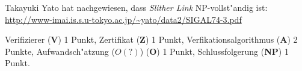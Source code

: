 \begin{diskussion}
Takayuki Yato hat nachgewiesen, dass {\em Slither Link}
NP-vollst"andig ist:
\url{http://www-imai.is.s.u-tokyo.ac.jp/~yato/data2/SIGAL74-3.pdf}
\end{diskussion}

\begin{bewertung}
Verifizierer (\textbf{V}) 1 Punkt,
Zertifikat (\textbf{Z}) 1 Punkt,
Verfikationsalgorithmus (\textbf{A}) 2 Punkte,
Aufwandsch"atzung ($O(?)$) (\textbf{O}) 1 Punkt,
Schlussfolgerung (\textbf{NP}) 1 Punkt.
\end{bewertung}
